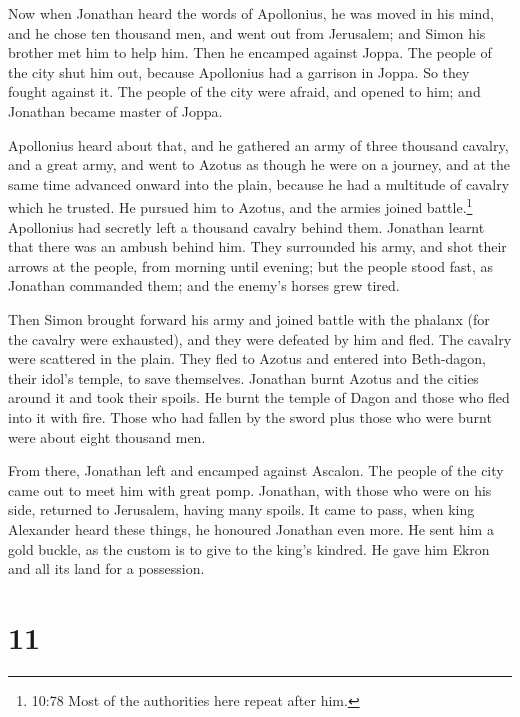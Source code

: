  Now when Jonathan heard the words of Apollonius, he was
moved in his mind, and he chose ten thousand men, and went out from
Jerusalem; and Simon his brother met him to help him.  Then
he encamped against Joppa. The people of the city shut him out, because
Apollonius had a garrison in Joppa.  So they fought against
it. The people of the city were afraid, and opened to him; and Jonathan
became master of Joppa.

 Apollonius heard about that, and he gathered an army of
three thousand cavalry, and a great army, and went to Azotus as though
he were on a journey, and at the same time advanced onward into the
plain, because he had a multitude of cavalry which he trusted.
 He pursued him to Azotus, and the armies joined
battle.\footnote{10:78 Most of the authorities here repeat after him.}
 Apollonius had secretly left a thousand cavalry behind
them.  Jonathan learnt that there was an ambush behind him.
They surrounded his army, and shot their arrows at the people, from
morning until evening;  but the people stood fast, as
Jonathan commanded them; and the enemy's horses grew tired.

 Then Simon brought forward his army and joined battle with
the phalanx (for the cavalry were exhausted), and they were defeated by
him and fled.  The cavalry were scattered in the plain.
They fled to Azotus and entered into Beth-dagon, their idol's temple, to
save themselves.  Jonathan burnt Azotus and the cities
around it and took their spoils. He burnt the temple of Dagon and those
who fled into it with fire.  Those who had fallen by the
sword plus those who were burnt were about eight thousand men.

 From there, Jonathan left and encamped against Ascalon.
The people of the city came out to meet him with great pomp.
 Jonathan, with those who were on his side, returned to
Jerusalem, having many spoils.  It came to pass, when king
Alexander heard these things, he honoured Jonathan even more.
 He sent him a gold buckle, as the custom is to give to the
king's kindred. He gave him Ekron and all its land for a possession.

\hypertarget{section-10}{%
\section{11}\label{section-10}}

